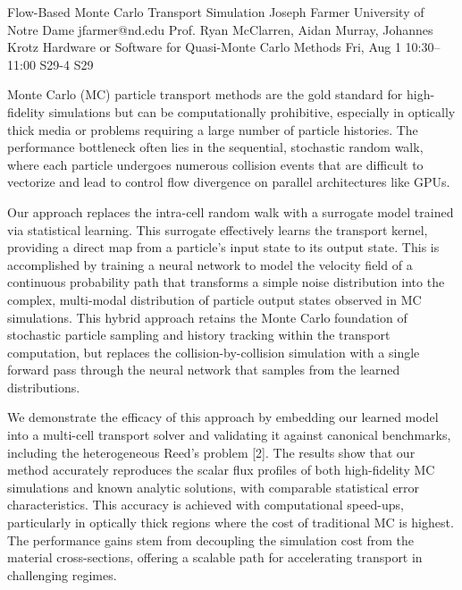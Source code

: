 \begin{talk}
  {Flow-Based Monte Carlo Transport Simulation}%
  {Joseph Farmer}%
  {University of Notre Dame}%
  {jfarmer@nd.edu}%
  {Prof. Ryan McClarren, Aidan Murray, Johannes Krotz}%
  {Hardware or Software for Quasi-Monte Carlo Methods}%
  {Fri, Aug 1 10:30--11:00}%
  {S29-4}%
  {S29}%

Monte Carlo (MC) particle transport methods are the gold standard for high-fidelity simulations but can be computationally prohibitive, especially in optically thick media or problems requiring a large number of particle histories. The performance bottleneck often lies in the sequential, stochastic random walk, where each particle undergoes numerous collision events that are difficult to vectorize and lead to control flow divergence on parallel architectures like GPUs.

Our approach replaces the intra-cell random walk with a surrogate model trained via statistical learning. This surrogate effectively learns the transport kernel, providing a direct map from a particle's input state to its output state. This is accomplished by training a neural network to model the velocity field of a continuous probability path that transforms a simple noise distribution into the complex, multi-modal distribution of particle output states observed in MC simulations. This hybrid approach retains the Monte Carlo foundation of stochastic particle sampling and history tracking within the transport computation, but replaces the collision-by-collision simulation with a single forward pass through the neural network that samples from the learned distributions.

We demonstrate the efficacy of this approach by embedding our learned model into a multi-cell transport solver and validating it against canonical benchmarks, including the heterogeneous Reed's problem [2]. The results show that our method accurately reproduces the scalar flux profiles of both high-fidelity MC simulations and known analytic solutions, with comparable statistical error characteristics. This accuracy is achieved with  computational speed-ups, particularly in optically thick regions where the cost of traditional MC is highest. The performance gains stem from decoupling the simulation cost from the material cross-sections, offering a scalable path for accelerating transport in challenging regimes. 


\end{talk}
